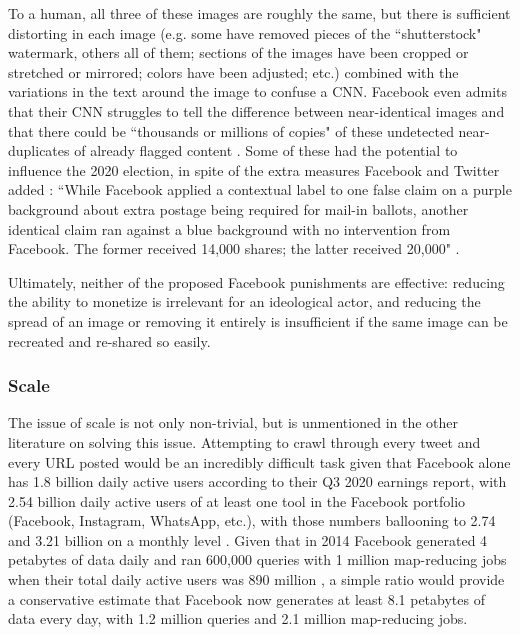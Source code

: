 \documentclass[preprint,review,12pt]{elsarticle}
\begin{document}
To a human, all three of these images are roughly the same, but there is sufficient distorting in each image (e.g. some have removed pieces of the ``shutterstock" watermark, others all of them; sections of the images have been cropped or stretched or mirrored; colors have been adjusted; etc.) combined with the variations in the text around the image to confuse a CNN. Facebook even admits that their CNN struggles to tell the difference between near-identical images and that there could be ``thousands or millions of copies" of these undetected near-duplicates of already flagged content \cite{sumbaly2020using}. Some of these had the potential to influence the 2020 election, in spite of the extra measures Facebook and Twitter added \cite{dean2020facebook}: ``While Facebook applied a contextual label to one false claim on a purple background about extra postage being required for mail-in ballots, another identical claim ran against a blue background with no intervention from Facebook. The former received 14,000 shares; the latter received 20,000" \cite{Fung2020facebook}.

Ultimately, neither of the proposed Facebook punishments are effective: reducing the ability to monetize is irrelevant for an ideological actor, and reducing the spread of an image or removing it entirely is insufficient if the same image can be recreated and re-shared so easily.

\subsubsection{Scale}
\label{Scale Section}
The issue of scale is not only non-trivial, but is unmentioned in the other literature on solving this issue. Attempting to crawl through every tweet and every URL posted would be an incredibly difficult task given that Facebook alone has 1.8 billion daily active users according to their Q3 2020 earnings report, with 2.54 billion daily active users of at least one tool in the Facebook portfolio (Facebook, Instagram, WhatsApp, etc.), with those numbers ballooning to 2.74 and 3.21 billion on a monthly level \cite{facebook2020q3}. Given that in 2014 Facebook generated 4 petabytes of data daily and ran 600,000 queries with 1 million map-reducing jobs when their total daily active users was 890 million \cite{bronson2015open}, a simple ratio would provide a conservative estimate that Facebook now generates at least 8.1 petabytes of data every day, with 1.2 million queries and 2.1 million map-reducing jobs. 
\end{document}
